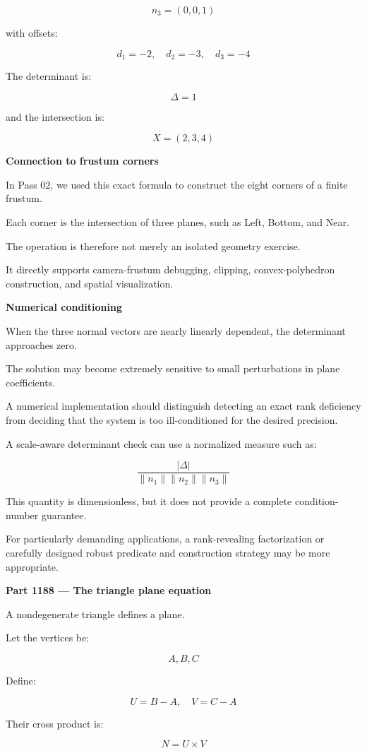 \[
n_3=(0,0,1)
\]

with offsets:

\[
d_1=-2,\quad d_2=-3,\quad d_3=-4
\]

The determinant is:

\[
\Delta=1
\]

and the intersection is:

\[
\boxed{X=(2,3,4)}
\]

\textbf{Connection to frustum corners}

In Pass 02, we used this exact formula to construct the eight corners of a finite frustum.

Each corner is the intersection of three planes, such as Left, Bottom, and Near.

The operation is therefore not merely an isolated geometry exercise.

It directly supports camera-frustum debugging, clipping, convex-polyhedron construction, and spatial visualization.

\textbf{Numerical conditioning}

When the three normal vectors are nearly linearly dependent, the determinant approaches zero.

The solution may become extremely sensitive to small perturbations in plane coefficients.

A numerical implementation should distinguish detecting an exact rank deficiency from deciding that the system is too ill-conditioned for the desired precision.

A scale-aware determinant check can use a normalized measure such as:

\[
\frac{|\Delta|} {\|n_1\|\|n_2\|\|n_3\|}
\]

This quantity is dimensionless, but it does not provide a complete condition-number guarantee.

For particularly demanding applications, a rank-revealing factorization or carefully designed robust predicate and construction strategy may be more appropriate.

\textbf{Part 1188 --- The triangle plane equation}

A nondegenerate triangle defines a plane.

Let the vertices be:

\[
A,B,C
\]

Define:

\[
U=B-A,\quad V=C-A
\]

Their cross product is:

\[
N=U\times V
\]

